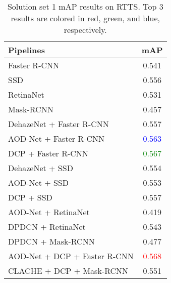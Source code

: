 \documentclass[10pt,twocolumn,letterpaper]{article}
\begin{document}
\begin{table}[t]
\begin{center}
\begin{tabular}{|l|c|}
\hline
\textbf{Pipelines} & \textbf{mAP} \\ 
 \hline
Faster R-CNN & 0.541 \\ \hline
SSD & 0.556 \\ \hline
RetinaNet & 0.531 \\ \hline
Mask-RCNN & 0.457 \\ \hline
\hline
DehazeNet + Faster R-CNN & 0.557 \\ \hline
AOD-Net + Faster R-CNN & \textcolor{blue}{0.563} \\ \hline
DCP + Faster R-CNN & \textcolor{green}{0.567} \\ \hline
DehazeNet + SSD & 0.554 \\ \hline
AOD-Net + SSD & 0.553\\ \hline
DCP + SSD & 0.557 \\ \hline
AOD-Net + RetinaNet & 0.419 \\ \hline
DPDCN + RetinaNet & 0.543 \\ \hline
DPDCN + Mask-RCNN & 0.477 \\ \hline
\hline
AOD-Net + DCP + Faster R-CNN & \textcolor{red}{0.568} \\ \hline
CLACHE + DCP + Mask-RCNN & 0.551 \\ \hline
\end{tabular}
\end{center}
\caption{Solution set 1 mAP results on RTTS. Top 3 results are colored in red, green, and blue, respectively.}
\label{detection1}
\end{table}







\end{document}
